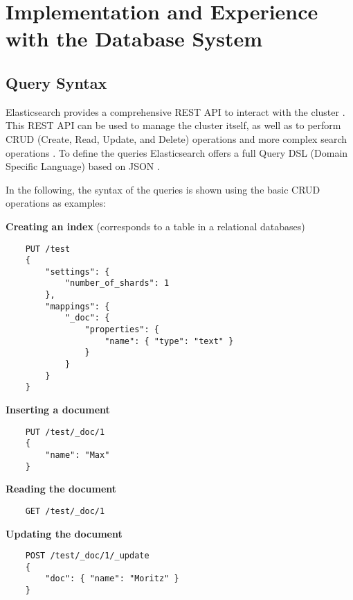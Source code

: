 \chapter{Implementation and Experience with the Database System}

\section{Query Syntax}
Elasticsearch provides a comprehensive REST API to interact with the cluster \autocite{elastic2019_08}. This REST API can be used to manage the cluster itself, as well as to perform CRUD (Create, Read, Update, and Delete) operations and more complex search operations \autocite{elastic2019_08}. To define the queries Elasticsearch offers a full Query DSL (Domain Specific Language) based on JSON \autocite{elastic2019_08}.

In the following, the syntax of the queries is shown using the basic CRUD operations as examples:


\begin{minipage}[c]{0.95\textwidth}
    \textbf{Creating an index}
    (corresponds to a table in a relational databases)
    \begin{lstlisting}
    PUT /test
    {
        "settings": {
            "number_of_shards": 1
        },
        "mappings": {
            "_doc": {
                "properties": {
                    "name": { "type": "text" }
                }
            }
        }
    }
    \end{lstlisting}
\end{minipage}

\begin{minipage}[c]{0.95\textwidth}
    \textbf{Inserting a document}
    \begin{lstlisting}
    PUT /test/_doc/1
    {
        "name": "Max"
    }
    \end{lstlisting}
\end{minipage}

\begin{minipage}[c]{0.95\textwidth}
    \textbf{Reading the document}
    \begin{lstlisting}
    GET /test/_doc/1
    \end{lstlisting}
\end{minipage}

\begin{minipage}[c]{0.95\textwidth}
    \textbf{Updating the document}
    \begin{lstlisting}
    POST /test/_doc/1/_update
    {
        "doc": { "name": "Moritz" }
    }
    \end{lstlisting}
\end{minipage}

